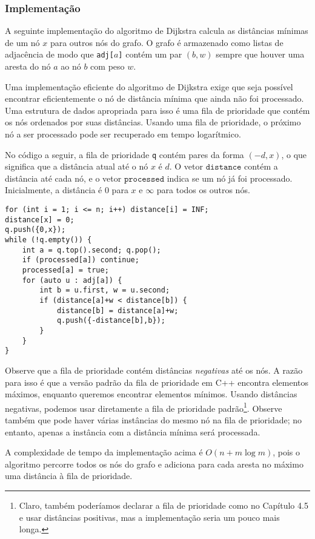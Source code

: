 \subsubsection{Implementação}

A seguinte implementação do algoritmo de Dijkstra
calcula as distâncias mínimas de um nó $x$
para outros nós do grafo.
O grafo é armazenado como listas de adjacência
de modo que \texttt{adj[$a$]} contém um par $(b,w)$
sempre que houver uma aresta do nó $a$ ao nó $b$
com peso $w$.

Uma implementação eficiente do algoritmo de Dijkstra
exige que seja possível encontrar eficientemente o
nó de distância mínima que ainda não foi processado.
Uma estrutura de dados apropriada para isso é uma fila de prioridade
que contém os nós ordenados por suas distâncias.
Usando uma fila de prioridade, o próximo nó a ser processado
pode ser recuperado em tempo logarítmico.

No código a seguir, a fila de prioridade
\texttt{q} contém pares da forma $(-d,x)$,
o que significa que a distância atual até o nó $x$ é $d$.
O vetor $\texttt{distance}$ contém a distância até
cada nó, e o vetor $\texttt{processed}$ indica
se um nó já foi processado.
Inicialmente, a distância é $0$ para $x$ e $\infty$ para todos os outros nós.

\begin{lstlisting}
for (int i = 1; i <= n; i++) distance[i] = INF;
distance[x] = 0;
q.push({0,x});
while (!q.empty()) {
    int a = q.top().second; q.pop();
    if (processed[a]) continue;
    processed[a] = true;
    for (auto u : adj[a]) {
        int b = u.first, w = u.second;
        if (distance[a]+w < distance[b]) {
            distance[b] = distance[a]+w;
            q.push({-distance[b],b});
        }
    }
}
\end{lstlisting}

Observe que a fila de prioridade contém distâncias
\emph{negativas} até os nós.
A razão para isso é que a
versão padrão da fila de prioridade em C++ encontra elementos máximos,
enquanto queremos encontrar elementos mínimos.
Usando distâncias negativas,
podemos usar diretamente a fila de prioridade padrão\footnote{Claro,
também poderíamos declarar a fila de prioridade como no Capítulo 4.5
e usar distâncias positivas, mas a implementação seria um pouco mais longa.}.
Observe também que pode haver várias instâncias do mesmo
nó na fila de prioridade; no entanto, apenas a instância com a
distância mínima será processada.

A complexidade de tempo da implementação acima é
$O(n+m \log m)$, pois o algoritmo percorre
todos os nós do grafo e adiciona para cada aresta
no máximo uma distância à fila de prioridade.

